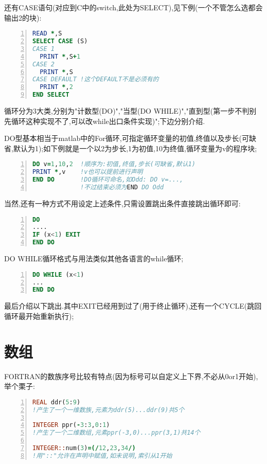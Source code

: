 还有CASE语句(对应到C中的switch,此处为SELECT),见下例(一个不管怎么选都会输出2的块):
\begin{lstlisting}[numbers=left,frame=single,language=Fortran]
READ *,S
SELECT CASE (S)
CASE 1
  PRINT *,S+1
CASE 2
  PRINT *,S
CASE DEFAULT !这个DEFAULT不是必须有的
  PRINT *,2
END SELECT
\end{lstlisting}
\par

循环分为3大类,分别为"计数型(DO)","当型(DO WHILE)","直到型(第一步不判别先循环这种实现不了,可以改while出口条件实现)";下边分别介绍.\par
DO型基本相当于matlab中的For循环,可指定循环变量的初值,终值以及步长(可缺省,默认为1);如下例就是一个以2为步长,1为初值,10为终值,循环变量为v的程序块;

\begin{lstlisting}[numbers=left,frame=single,language=Fortran]
DO v=1,10,2  !顺序为:初值,终值,步长(可缺省,默认1)
PRINT *,v    !v也可以提前进行声明
END DO       !DO循环可命名,如Odd: DO v=...,
             !不过结束必须为END DO Odd
\end{lstlisting}
\par

当然,还有一种方式不用设定上述条件,只需设置跳出条件直接跳出循环即可:
\begin{lstlisting}[numbers=left,frame=single,language=Fortran]
DO
....
IF (x<1) EXIT
END DO
\end{lstlisting}
\par

DO WHILE循环格式与用法类似其他各语言的while循环;

\begin{lstlisting}[numbers=left,frame=single,language=Fortran]
DO WHILE (x<1)
...
END DO
\end{lstlisting}
\par

最后介绍以下跳出.其中EXIT已经用到过了(用于终止循环),还有一个CYCLE(跳回循环最开始重新执行);

\section{数组}
FORTRAN的数族序号比较有特点(因为标号可以自定义上下界,不必从0or1开始),举个栗子:
\begin{lstlisting}[numbers=left,frame=single,language=Fortran]
REAL ddr(5:9)  
!产生了一个一维数族,元素为ddr(5)...ddr(9)共5个

INTEGER ppr(-3:3,0:1)
!产生了一个二维数组,元素ppr(-3,0)...ppr(3,1)共14个

INTEGER::num(3)=(/12,23,34/)
!用"::"允许在声明中赋值,如未说明,索引从1开始
\end{lstlisting}
\par

